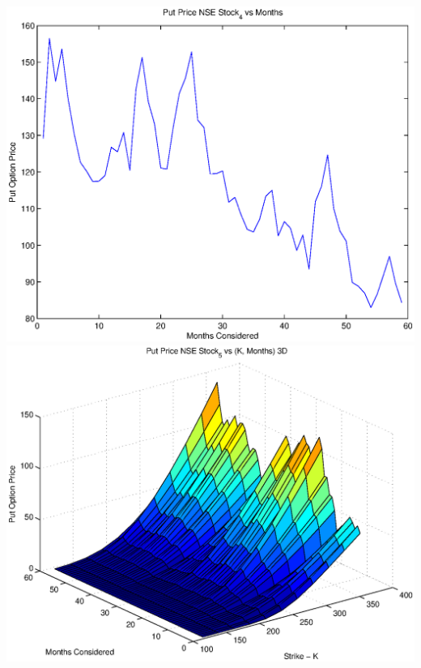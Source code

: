 \documentclass{article}
\begin{document}
\includegraphics[width=\textwidth]{Put_Price_NSE_Stock_4_vs_Months} \\

\includegraphics[width=\textwidth]{Put_Price_NSE_Stock_5_vs_(K,_Months)_3D} \\
\end{document}
